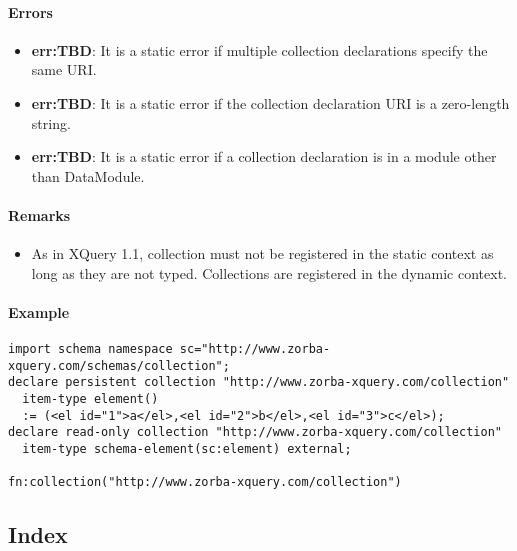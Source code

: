 \documentclass[]{article}
\begin{document}
\vspace{0.5cm}

\paragraph{Errors}
\begin{itemize}
  \item \textbf{err:TBD}: It is a static error if multiple collection declarations specify the same URI.
  \item \textbf{err:TBD}: It is a static error if the collection declaration URI is a zero-length string.
  \item \textbf{err:TBD}: It is a static error if a collection declaration is in a module other than DataModule.
\end{itemize}

\paragraph{Remarks}
\begin{itemize}
  \item As in XQuery 1.1, collection must not be registered in the static context as long as they are not typed. Collections are registered in the dynamic context.
\end{itemize}

\paragraph{Example}
\begin{verbatim}
import schema namespace sc="http://www.zorba-xquery.com/schemas/collection";
declare persistent collection "http://www.zorba-xquery.com/collection" 
  item-type element() 
  := (<el id="1">a</el>,<el id="2">b</el>,<el id="3">c</el>);
declare read-only collection "http://www.zorba-xquery.com/collection" 
  item-type schema-element(sc:element) external;

fn:collection("http://www.zorba-xquery.com/collection")
\end{verbatim}

\subsection{Index}
\end{document}
